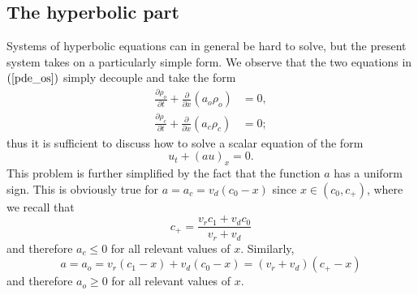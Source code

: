 \subsection{The hyperbolic part}
Systems of hyperbolic equations can
in general be hard to solve, but the present system takes on a particularly
simple form. We observe that the two equations in $\left( \ref{pde_os}%
\right)  $ simply decouple and take the form%
\begin{align}
\frac{\partial\rho_{o}}{\partial t}+\frac{\partial}{\partial x}\left(
a_{o}\rho_{o}\right)   &  =0,\label{os_600}\\
\frac{\partial\rho_{c}}{\partial t}+\frac{\partial}{\partial x}\left(
a_{c}\rho_{c}\right)   &  =0;\nonumber
\end{align}
thus it is sufficient to discuss how to solve a scalar equation of the form%
\begin{equation}
u_{t}+\left(  au\right)  _{x}=0.\label{os_601}%
\end{equation}
This problem is further simplified by the fact that the function $a$ has a
uniform sign. This is obviously true for $a=a_{c}=v_{d}(c_{0}-x)$ since
$x\in\left(  c_{0},c_{+}\right)$, where we recall that%
\begin{equation}
c_{+}=\frac{v_{r}c_{1}+v_{d}c_{0}}{v_{r}+v_{d}}
\end{equation}
and therefore $a_{c}\leq0$ for all relevant values of $x.$ Similarly,%
\begin{equation}
a=a_{o}=v_{r}(c_{1}-x)+v_{d}(c_{0}-x)=\left(  v_{r}+v_{d}\right)  \left(
c_{+}-x\right)
\end{equation}
and therefore $a_{o}\geq0$ for all relevant values of $x.$

